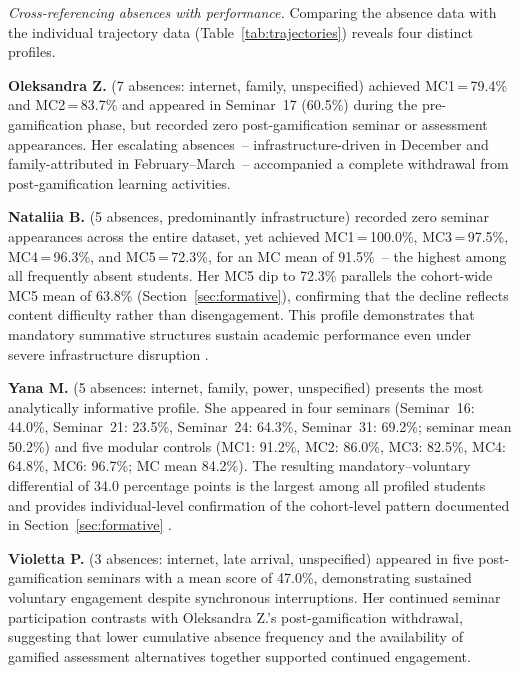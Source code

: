 \textit{Cross-referencing absences with performance.} Comparing the absence data with the individual trajectory data (Table~\ref{tab:trajectories}) reveals four distinct profiles.

\textbf{Oleksandra Z.} (7 absences: internet, family, unspecified) achieved MC1\,=\,79.4\% and MC2\,=\,83.7\% and appeared in Seminar~17 (60.5\%) during the pre-gamification phase, but recorded zero post-gamification seminar or assessment appearances. Her escalating absences~-- infrastructure-driven in December and family-attributed in February--March~-- accompanied a complete withdrawal from post-gamification learning activities.

\textbf{Nataliia B.} (5 absences, predominantly infrastructure) recorded zero seminar appearances across the entire dataset, yet achieved MC1\,=\,100.0\%, MC3\,=\,97.5\%, MC4\,=\,96.3\%, and MC5\,=\,72.3\%, for an MC mean of 91.5\%~-- the highest among all frequently absent students. Her MC5 dip to 72.3\% parallels the cohort-wide MC5 mean of 63.8\% (Section~\ref{sec:formative}), confirming that the decline reflects content difficulty rather than disengagement. This profile demonstrates that mandatory summative structures sustain academic performance even under severe infrastructure disruption \cite{Martynets202428}.

\textbf{Yana M.} (5 absences: internet, family, power, unspecified) presents the most analytically informative profile. She appeared in four seminars (Seminar~16: 44.0\%, Seminar~21: 23.5\%, Seminar~24: 64.3\%, Seminar~31: 69.2\%; seminar mean 50.2\%) and five modular controls (MC1: 91.2\%, MC2: 86.0\%, MC3: 82.5\%, MC4: 64.8\%, MC6: 96.7\%; MC mean 84.2\%). The resulting mandatory--voluntary differential of 34.0 percentage points is the largest among all profiled students and provides individual-level confirmation of the cohort-level pattern documented in Section~\ref{sec:formative} \cite{Zamkova2023299}.

\textbf{Violetta P.} (3 absences: internet, late arrival, unspecified) appeared in five post-gamification seminars with a mean score of 47.0\%, demonstrating sustained voluntary engagement despite synchronous interruptions. Her continued seminar participation contrasts with Oleksandra Z.'s post-gamification withdrawal, suggesting that lower cumulative absence frequency and the availability of gamified assessment alternatives together supported continued engagement.

